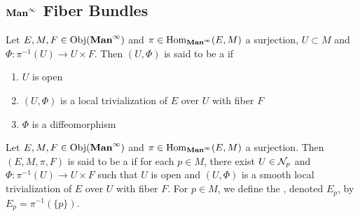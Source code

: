\documentclass{book}
\begin{document}
	\subsection{$\operatorname*{\text{\textbf{Man}}^{\infty}}$ Fiber Bundles}
	
	\begin{defn}
		Let $E, M, F \in \operatorname{Obj}(\operatorname*{\text{\textbf{Man}}^{\infty}})$ and $\pi \in \operatorname{Hom}_{\operatorname*{\text{\textbf{Man}}^{\infty}}}(E, M)$ a surjection, $U \subset M$ and $\Phi: \pi^{-1}(U) \rightarrow U \times F$. Then $(U, \Phi)$ is said to be a   if 
		\begin{enumerate}
			\item $U$ is open
			\item $(U, \Phi)$ is a local trivialization of $E$ over $U$ with fiber $F$
			\item $\Phi$ is a diffeomorphism
		\end{enumerate}
	\end{defn}

	\begin{defn}
		Let $E,M, F \in \operatorname{Obj}(\operatorname*{\text{\textbf{Man}}^{\infty}})$ and $\pi \in \operatorname{Hom}_{\operatorname*{\text{\textbf{Man}}^{\infty}}}(E, M)$ a surjection. Then $(E, M, \pi, F)$ is said to be a  if for each $p \in M$, there exist $U \in \mathcal{N}_p$ and $\Phi: \pi^{-1}(U) \rightarrow U \times F$ such that $U$ is open and $(U, \Phi)$ is a smooth local trivialization of $E$ over $U$ with fiber $F$. For $p \in M$, we define the , denoted $E_p$, by $E_p = \pi^{-1}(\{p\})$.
	\end{defn}
\end{document}
